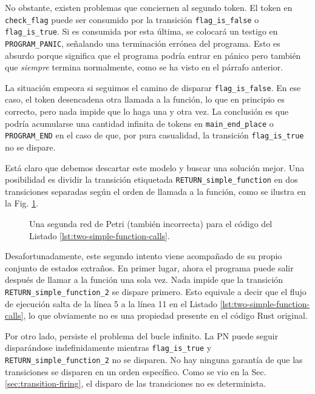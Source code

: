 No obstante, existen problemas que conciernen al segundo token.
El token en \texttt{check\_flag} puede ser consumido
por la transición \texttt{flag\_is\_false} o \texttt{flag\_is\_true}.
Si es consumida por esta última, se colocará un testigo en \texttt{PROGRAM\_PANIC},
señalando una terminación errónea del programa.
Esto es absurdo porque significa que el programa podría entrar en pánico pero
también que \emph{siempre} termina normalmente, como se ha visto en el párrafo anterior.

La situación empeora si seguimos el camino de disparar \texttt{flag\_is\_false}.
En ese caso, el token desencadena otra llamada a la función,
lo que en principio es correcto, pero nada impide que lo haga una y otra vez.
La conclusión es que podría acumularse una cantidad infinita de
tokens en \texttt{main\_end\_place} o \texttt{PROGRAM\_END} en el caso de que,
por pura casualidad, la transición \texttt{flag\_is\_true} no se dispare.

Está claro que debemos descartar este modelo y buscar una solución mejor. Una posibilidad es
dividir la transición etiquetada \texttt{RETURN\_simple\_function} en dos transiciones separadas según
el orden de llamada a la función, como se ilustra en la Fig. \ref{fig:two-function-calls-incorrect-2}.

\begin{figure}[!htbp]
    \centering
    
    \caption{Una segunda red de Petri (también incorrecta) para el código del Listado \ref{lst:two-simple-function-calls}.}
    \label{fig:two-function-calls-incorrect-2}
\end{figure}

Desafortunadamente, este segundo intento viene acompañado de su propio conjunto de estados extraños.
En primer lugar, ahora el programa puede salir después de llamar a la función una sola vez.
Nada impide que la transición \texttt{RETURN\_simple\_function\_2} se dispare primero.
Esto equivale a decir que el flujo de ejecución salta de la línea 5 a la línea 11 en el Listado \ref{lst:two-simple-function-calls},
lo que obviamente no es una propiedad presente en el código Rust original.

Por otro lado, persiste el problema del bucle infinito.
La \acrshort{PN} puede seguir disparándose indefinidamente
mientras \texttt{flag\_is\_true} y \texttt{RETURN\_simple\_function\_2} no se disparen.
No hay ninguna garantía de que las transiciones se disparen en un orden específico.
Como se vio en la Sec. \ref{sec:transition-firing}, el disparo de las transiciones no es determinista.

